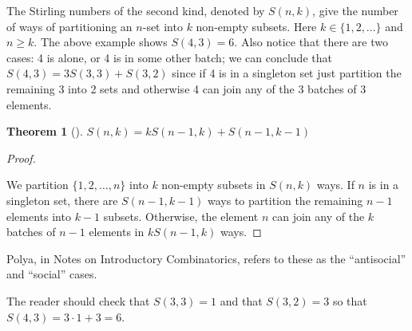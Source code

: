 \documentclass[10pt,]{book}
\theoremstyle{plain}
\newtheorem{theorem}{Theorem}[section]
\theoremstyle{definition}
\theoremstyle{definition}
\theoremstyle{definition}
\theoremstyle{definition}
\numberwithin{equation}{chapter}
\begin{document}
\par
\hypertarget{p-1068}{}%
The Stirling numbers of the second kind, denoted by \(S(n,k)\), give the number of ways of partitioning an \(n\)-set into \(k\) non-empty subsets. Here \(k \in \{1,2,\ldots\}\) and \(n \geq k\). The above example shows \(S(4, 3) = 6\). Also notice that there are two cases: 4 is alone, or 4 is in some other batch; we can conclude that \(S(4, 3) = 3S(3,3) + S(3,2)\) since if 4 is in a singleton set just partition the remaining 3 into 2 sets and otherwise 4 can join any of the 3 batches of 3 elements.%
\begin{theorem}[{}]\label{thm-stirling-recursion}
\hypertarget{p-1069}{}%
\(S(n,k) = kS(n - 1,k) + S(n - 1,k - 1)\)%
\end{theorem}
\begin{proof}\hypertarget{proof-11}{}
\hypertarget{p-1070}{}%
We partition \(\{1,2,\ldots,n\}\) into \(k\) non-empty subsets in \(S(n,k)\) ways. If \(n\) is in a singleton set, there are \(S(n - 1,k - 1)\) ways to partition the remaining \(n - 1\) elements into \(k - 1\) subsets. Otherwise, the element \(n\) can join any of the \(k\) batches of \(n-1\) elements in \(kS(n - 1,k)\) ways.%
\end{proof}
\hypertarget{p-1071}{}%
Polya, in Notes on Introductory Combinatorics, refers to these as the ``antisocial'' and ``social'' cases.%
\par
\hypertarget{p-1072}{}%
The reader should check that \(S(3,3) = 1\) and that \(S(3,2) = 3\) so that \(S(4,3) = 3 \cdot 1 + 3 = 6\).%
\typeout{************************************************}
\typeout{************************************************}
\end{document}

